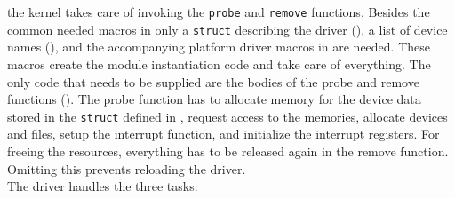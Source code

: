 \documentclass[11pt,technote,a4paper,onecolumn,dvips]{IEEEtran}
\begin{document}
the kernel takes care of invoking the \lstinline+probe+ and
\lstinline+remove+ functions. Besides the common needed macros in
  only a \lstinline+struct+ describing the
driver (), a list of device names (),
and the accompanying platform driver macros in  are needed.
These macros create the module instantiation code and take care of
everything. The only code that needs to be supplied are the bodies of
the probe and remove functions (). The probe function
has to allocate memory for the device data stored in the
\lstinline+struct+ defined in , request access to the
memories, allocate devices and files, setup the interrupt function, and
initialize the interrupt registers. For freeing the resources, everything
has to be released again in the remove function. Omitting this prevents
reloading the driver.\\
The driver handles the three tasks:
\end{document}
